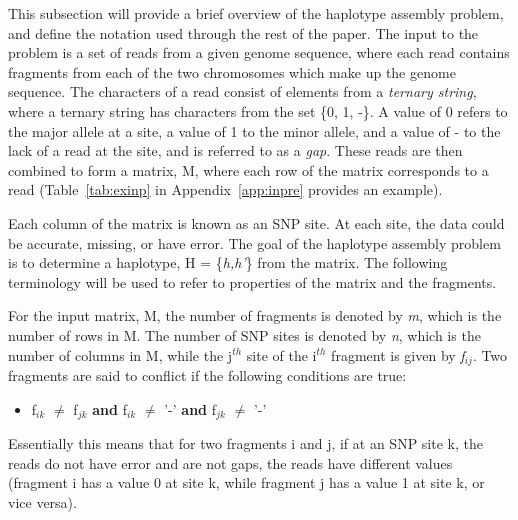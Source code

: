 \documentclass[10pt,a4paer,twocolumn]{article}
\begin{document}
This subsection will provide a brief overview of the haplotype assembly problem, and define the
notation used through the rest of the paper. The input to the problem is a set of reads from a given genome
sequence, where each read contains fragments from each of the two chromosomes which make up the genome
sequence. The characters of a read consist of elements from a \textit{ternary string}, where a ternary
string has characters from the set \{0, 1, -\}. A value of 0 refers to the major allele
at a site, a value of 1 to the minor allele, and a value of - to the lack of a read at the site, and is
referred to as a \textit{gap}. These reads are then combined to form a matrix, M, where each row of the 
matrix corresponds to a read (Table~\ref{tab:exinp} in Appendix~\ref{app:inpre} provides an example). 

Each column of the matrix is known as an SNP site. At each site, the data could be accurate, missing, or have
error. The goal of the haplotype assembly problem is to determine a haplotype, H = \{\textit{h,h'}\}
from the matrix. The following terminology will be used to refer to properties of the matrix and the
fragments. 

For the input matrix, M, the number of fragments is denoted by \textit{m}, which is the number of rows in M.
The number of SNP sites is denoted by \textit{n}, which is the number of columns in M, while the j$^{th}$ 
site of the i$^{th}$ fragment is given by \textit{f$_{ij}$}. Two fragments are said to 
conflict if the following conditions are true:
\begin{itemize}
    \item{f$_{ik}$ $\neq$ f$_{jk}$ \textbf{and} f$_{ik}$ $\neq$ '-' \textbf{and} f$_{jk}$ $\neq$ '-' }
\end{itemize}
Essentially this means that for two fragments i and j, if at an SNP site k, the reads do not have error and are 
not gaps, the reads have different values (fragment i has a value 0 at site k, while fragment j has a value 
1 at site k, or vice versa). 
\end{document}
